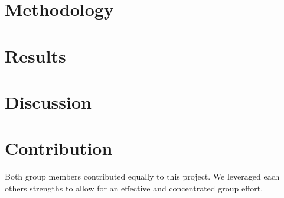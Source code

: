 \documentclass[conference]{IEEEtran}
\begin{document}
\section{Methodology}

\section{Results}

\section{Discussion}

\section{Contribution}
Both group members contributed equally to this project. We leveraged each others strengths to allow for an effective and concentrated group effort.
\end{document}
